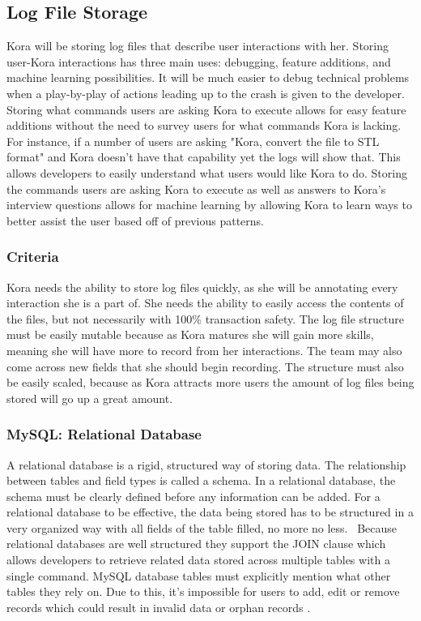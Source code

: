 \documentclass[onecolumn, draftclsnofoot,10pt, compsoc]{IEEEtran}
\begin{document}
	\subsection{Log File Storage}
	Kora will be storing log files that describe user interactions with her.
	Storing user-Kora interactions has three main uses: debugging, feature additions, and machine learning possibilities.
	It will be much easier to debug technical problems when a play-by-play of actions leading up to the crash is given to the developer.
	Storing what commands users are asking Kora to execute allows for easy feature additions without the need to survey users for what commands Kora is lacking.
	For instance, if a number of users are asking "Kora, convert the file to STL format" and Kora doesn't have that capability yet the logs will show that.
	This allows developers to easily understand what users would like Kora to do.
	Storing the commands users are asking Kora to execute as well as answers to Kora's interview questions allows for machine learning by allowing Kora to learn ways to better assist the user based off of previous patterns.

	\subsubsection{Criteria}
	Kora needs the ability to store log files quickly, as she will be annotating every interaction she is a part of.
	She needs the ability to easily access the contents of the files, but not necessarily with 100\% transaction safety.
	The log file structure must be easily mutable because as Kora matures she will gain more skills, meaning she will have more to record from her interactions.
	The team may also come across new fields that she should begin recording.
	The structure must also be easily scaled, because as Kora attracts more users the amount of log files being stored will go up a great amount.


	\subsubsection{MySQL: Relational Database}
	A relational database is a rigid, structured way of storing data.
	The relationship between tables and field types is called a schema.
	In a relational database, the schema must be clearly defined before any information can be added.
	For a relational database to be effective, the data being stored has to be structured in a very organized way with all fields of the table filled, no more no less. 
	Because relational databases are well structured they support the JOIN clause which allows developers to retrieve related data stored across multiple tables with a single command.
	MySQL database tables must explicitly mention what other tables they rely on.
	Due to this, it's impossible for users to add, edit or remove records which could result in invalid data or orphan records \cite{SQLvsNoSQLsitepoint}.
\end{document}
